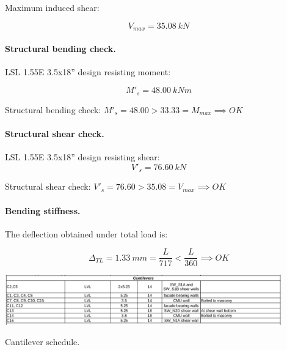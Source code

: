 \noindent Maximum induced shear:

\begin{equation}
  V_{max}= 35.08\ kN
\end{equation}

\paragraph{Structural bending check.}

\noindent LSL 1.55E 3.5x18'' design resisting moment:

\begin{equation}
  M'_s= 48.00\ kN m
\end{equation}

\noindent Structural bending check: $M'_s = 48.00 > 33.33 = M_{max} \implies OK$

\paragraph{Structural shear check.}

\noindent LSL 1.55E 3.5x18'' design resisting shear:
\begin{equation}
  V'_s= 76.60\ kN
\end{equation}

\noindent Structural shear check: $V'_s = 76.60 > 35.08 = V_{max} \implies OK$

\paragraph{Bending stiffness.}
The deflection obtained under total load is:

\begin{equation}
  \Delta_{TL}= 1.33\ mm= \frac{L}{717} < \frac{L}{360} \implies OK
\end{equation}

\begin{table}
  \begin{center}
  \includegraphics[width=120mm]{figures/cantilever_schedule}
  \end{center}
  \caption{Cantilever schedule.}\label{fg_2nd_floor_cantilevers_schedule}
\end{table}
